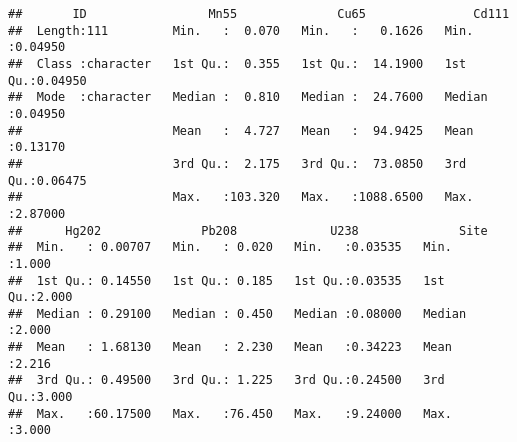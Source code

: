 \documentclass[]{article}
\newenvironment{Shaded}{\begin{snugshade}}{\end{snugshade}}
\newcommand{\DataTypeTok}[1]{\textcolor[rgb]{0.13,0.29,0.53}{#1}}
\newcommand{\DecValTok}[1]{\textcolor[rgb]{0.00,0.00,0.81}{#1}}
\newcommand{\KeywordTok}[1]{\textcolor[rgb]{0.13,0.29,0.53}{\textbf{#1}}}
\newcommand{\NormalTok}[1]{#1}
\newcommand{\OperatorTok}[1]{\textcolor[rgb]{0.81,0.36,0.00}{\textbf{#1}}}
\newcommand{\StringTok}[1]{\textcolor[rgb]{0.31,0.60,0.02}{#1}}
\begin{document}
\begin{verbatim}
##       ID                 Mn55              Cu65               Cd111        
##  Length:111         Min.   :  0.070   Min.   :   0.1626   Min.   :0.04950  
##  Class :character   1st Qu.:  0.355   1st Qu.:  14.1900   1st Qu.:0.04950  
##  Mode  :character   Median :  0.810   Median :  24.7600   Median :0.04950  
##                     Mean   :  4.727   Mean   :  94.9425   Mean   :0.13170  
##                     3rd Qu.:  2.175   3rd Qu.:  73.0850   3rd Qu.:0.06475  
##                     Max.   :103.320   Max.   :1088.6500   Max.   :2.87000  
##      Hg202              Pb208             U238              Site      
##  Min.   : 0.00707   Min.   : 0.020   Min.   :0.03535   Min.   :1.000  
##  1st Qu.: 0.14550   1st Qu.: 0.185   1st Qu.:0.03535   1st Qu.:2.000  
##  Median : 0.29100   Median : 0.450   Median :0.08000   Median :2.000  
##  Mean   : 1.68130   Mean   : 2.230   Mean   :0.34223   Mean   :2.216  
##  3rd Qu.: 0.49500   3rd Qu.: 1.225   3rd Qu.:0.24500   3rd Qu.:3.000  
##  Max.   :60.17500   Max.   :76.450   Max.   :9.24000   Max.   :3.000
\end{verbatim}

\begin{Shaded}
\end{Shaded}
\end{document}
